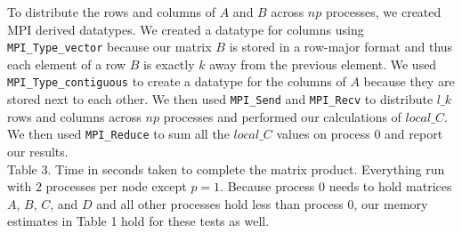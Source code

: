 \documentclass[11pt]{article}
\begin{document}
To distribute the rows and columns of $A$ and $B$ across $np$ processes, we created MPI derived datatypes. We created a datatype for columns using \texttt{MPI\_Type\_vector} because our matrix $B$ is stored in a row-major format and thus each element of a row $B$ is exactly $k$ away from the previous element. We used \texttt{MPI\_Type\_contiguous} to create a datatype for the columns of $A$ because they are stored next to each other. We then used \texttt{MPI\_Send} and \texttt{MPI\_Recv} to distribute $l\_k$ rows and columns across $np$ processes and performed our calculations of $local\_C$. We then used \texttt{MPI\_Reduce} to sum all the $local\_C$ values on process $0$ and report our results.
\\
Table 3. Time in seconds taken to complete the matrix product. Everything run with $2$ processes per node except $p=1$. Because process $0$ needs to hold matrices $A$, $B$, $C$, and $D$ and all other processes hold less than process $0$, our memory estimates in Table 1 hold for these tests as well.
\clearpage
\begin{table}
\end{table}
\end{document}
